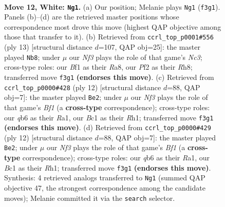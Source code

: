 \documentclass[11pt]{article}
\begin{document}
\clearpage

\begin{figure}[p]\centering
\begin{subfigure}{0.46\textwidth}\centering
\resizebox{\linewidth}{!}{%
\newchessgame
\chessboard[
  setfen={r3k1nr/pp1b4/1qn1p3/2bpPp1p/6p1/P1P2N2/1P1NQPPP/R1B1KB1R w Kkq - 0 12},
  showmover=false,
  pgfstyle=straightmove, color=movearrow, markmove={f3-g1}
]}
\caption{}
\end{subfigure}\hfill
\begin{subfigure}{0.46\textwidth}\centering
\resizebox{\linewidth}{!}{%
\newchessgame
\chessboard[
  setfen={r1bqk2r/ppp1npbp/2np2p1/3Pp3/4P3/2PB1N1P/PP3PP1/RNBQK2R b KQkq - 0 7},
  showmover=false,
  pgfstyle=straightmove, color=movearrow, markmove={c6-b8}
]}
\caption{}
\end{subfigure}
\\[4pt]
\begin{subfigure}{0.46\textwidth}\centering
\resizebox{\linewidth}{!}{%
\newchessgame
\chessboard[
  setfen={r2qkbnr/pp1n1pp1/2p1p2p/3pPb2/3P4/P4N2/1PPN1PPP/R1BQKB1R w KQkq - 0 7},
  showmover=false,
  pgfstyle=straightmove, color=movearrow, markmove={f1-e2}
]}
\caption{}
\end{subfigure}\hfill
\begin{subfigure}{0.46\textwidth}\centering
\resizebox{\linewidth}{!}{%
\newchessgame
\chessboard[
  setfen={r2qkbnr/pp1n1pp1/2p1p2p/3pPb2/3P4/P4N2/1PPN1PPP/R1BQKB1R w KQkq - 0 7},
  showmover=false,
  pgfstyle=straightmove, color=movearrow, markmove={f1-e2}
]}
\caption{}
\end{subfigure}
\caption{\textbf{Move 12, White: \texttt{Ng1}.} (a) Our position; Melanie plays \texttt{Ng1} (\texttt{f3g1}). Panels (b)--(d) are the retrieved master positions whose correspondence most drove this move (highest QAP objective among those that transfer to it). (b) Retrieved from \texttt{ccrl\_top\_p0001\#556} (ply 13) [structural distance $d$=107, QAP obj=25]: the master played \texttt{Nb8}; under $\mu$ our \emph{Nf3} plays the role of that game's \emph{Nc3}; cross-type roles: our \emph{B}f1 as their \emph{R}a8, our \emph{P}f2 as their \emph{R}h8; transferred move \texttt{f3g1} \textbf{(endorses this move)}. (c) Retrieved from \texttt{ccrl\_top\_p0000\#428} (ply 12) [structural distance $d$=88, QAP obj=7]: the master played \texttt{Be2}; under $\mu$ our \emph{Nf3} plays the role of that game's \emph{Bf1} (a \textbf{cross-type} correspondence); cross-type roles: our \emph{q}b6 as their \emph{R}a1, our \emph{B}c1 as their \emph{R}h1; transferred move \texttt{f3g1} \textbf{(endorses this move)}. (d) Retrieved from \texttt{ccrl\_top\_p0000\#429} (ply 12) [structural distance $d$=88, QAP obj=7]: the master played \texttt{Be2}; under $\mu$ our \emph{Nf3} plays the role of that game's \emph{Bf1} (a \textbf{cross-type} correspondence); cross-type roles: our \emph{q}b6 as their \emph{R}a1, our \emph{B}c1 as their \emph{R}h1; transferred move \texttt{f3g1} \textbf{(endorses this move)}. Synthesis: 4 retrieved analogs transferred to \texttt{Ng1} (summed QAP objective 47, the strongest correspondence among the candidate moves); Melanie committed it via the \texttt{search} selector.}
\label{fig:thought-m22}
\end{figure}
\end{document}
